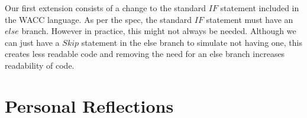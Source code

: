 \documentclass[a4paper, 11pt]{article} %
\begin{document}
Our first extension consists of a change to the standard $ IF $ statement included in the WACC language. As per the spec, the standard $ IF $ statement must have an $ else $ branch. However in practice, this might not always be needed. Although we can just have a $ Skip $ statement in the else branch to simulate not having one, this creates less readable code and removing the need for an else branch increases readability of code.





\section*{Personal Reflections}
\end{document}
